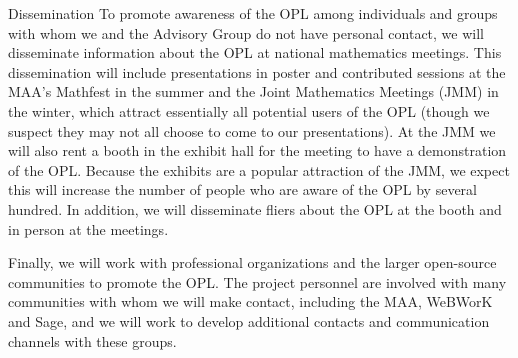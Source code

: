 \documentclass[11pt]{article}
\begin{document}
\begin{section}{Dissemination}
To promote awareness of the OPL among individuals and groups with whom we
and the Advisory Group do not have personal contact, we will disseminate
information about the OPL at national mathematics meetings.  This
dissemination will include presentations in poster and contributed
sessions at the MAA's Mathfest in the summer and the Joint Mathematics
Meetings (JMM) in the winter, which attract essentially all potential
users of the OPL (though we suspect they may not all choose to come to our
presentations).  At the JMM we will also rent a booth in the exhibit hall
for the meeting to have a demonstration of the OPL.  Because the exhibits
are a popular attraction of the JMM, we expect this will increase the
number of people who are aware of the OPL by several hundred.  In
addition, we will disseminate fliers about the OPL at the booth and in
person at the meetings.

Finally, we will work with professional organizations and the larger
open-source communities to promote the OPL.  The project personnel are
involved with many communities with whom we will make contact, including
the MAA, WeBWorK and Sage, and we will work to develop additional contacts
and communication channels with these groups.

\end{section}
\end{document}
